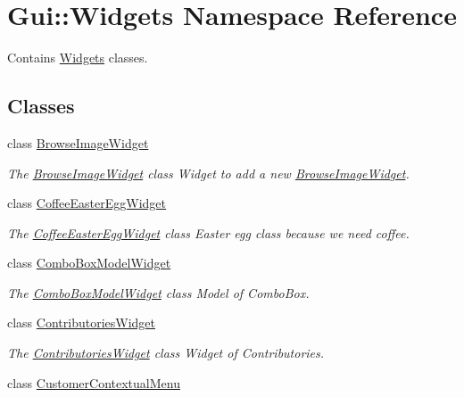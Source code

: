 \hypertarget{namespaceGui_1_1Widgets}{\section{Gui\-:\-:Widgets Namespace Reference}
\label{namespaceGui_1_1Widgets}
}


Contains \hyperlink{namespaceGui_1_1Widgets}{Widgets} classes.  


\subsection*{Classes}
\begin{DoxyCompactItemize}
\item 
class \hyperlink{classGui_1_1Widgets_1_1BrowseImageWidget}{Browse\-Image\-Widget}
\begin{DoxyCompactList}\small\item\em The \hyperlink{classGui_1_1Widgets_1_1BrowseImageWidget}{Browse\-Image\-Widget} class Widget to add a new \hyperlink{classGui_1_1Widgets_1_1BrowseImageWidget}{Browse\-Image\-Widget}. \end{DoxyCompactList}\item 
class \hyperlink{classGui_1_1Widgets_1_1CoffeeEasterEggWidget}{Coffee\-Easter\-Egg\-Widget}
\begin{DoxyCompactList}\small\item\em The \hyperlink{classGui_1_1Widgets_1_1CoffeeEasterEggWidget}{Coffee\-Easter\-Egg\-Widget} class Easter egg class because we need coffee. \end{DoxyCompactList}\item 
class \hyperlink{classGui_1_1Widgets_1_1ComboBoxModelWidget}{Combo\-Box\-Model\-Widget}
\begin{DoxyCompactList}\small\item\em The \hyperlink{classGui_1_1Widgets_1_1ComboBoxModelWidget}{Combo\-Box\-Model\-Widget} class Model of Combo\-Box. \end{DoxyCompactList}\item 
class \hyperlink{classGui_1_1Widgets_1_1ContributoriesWidget}{Contributories\-Widget}
\begin{DoxyCompactList}\small\item\em The \hyperlink{classGui_1_1Widgets_1_1ContributoriesWidget}{Contributories\-Widget} class Widget of Contributories. \end{DoxyCompactList}\item 
class \hyperlink{classGui_1_1Widgets_1_1CustomerContextualMenu}{Customer\-Contextual\-Menu}

\end{DoxyCompactItemize}
